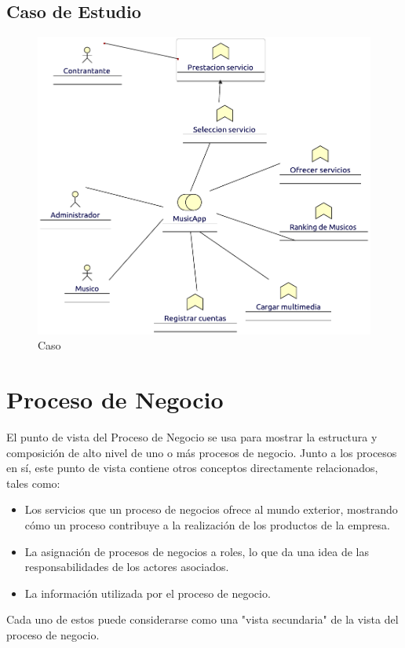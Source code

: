 \subsection{Caso de Estudio}

\begin{figure}[h!]
	\centering
	\includegraphics[width=\linewidth]{Arquitectura/Negocio/imgs/FuncionNegocio.pdf}
	\caption{Caso}
\end{figure}
\newpage  

\section{Proceso de Negocio}
El punto de vista del Proceso de Negocio se usa para mostrar la estructura y composición de alto nivel de uno o más procesos de negocio. Junto a los procesos en sí, este punto de vista contiene otros conceptos directamente relacionados, tales como:
\begin{itemize}
\item Los servicios que un proceso de negocios ofrece al mundo exterior, mostrando cómo un proceso contribuye a la realización de los productos de la empresa.
\item La asignación de procesos de negocios a roles, lo que da una idea de las responsabilidades de los actores asociados.
\item La información utilizada por el proceso de negocio. 
\end{itemize}
Cada uno de estos puede considerarse como una "vista secundaria" de la vista del proceso de negocio.
